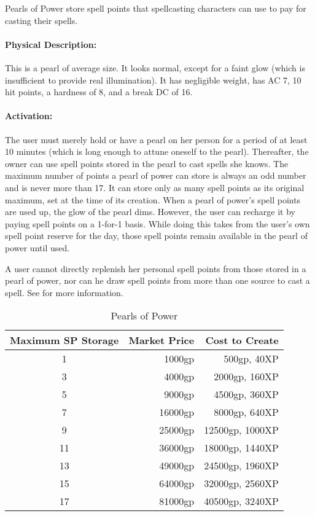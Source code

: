 Pearls of Power store spell points that spellcasting characters can use to pay
for casting their spells.

\paragraph{Physical Description:} This is a pearl of average size.
It looks normal, except for a faint glow (which is insufficient to provide real
illumination). It has negligible weight, has AC 7, 10 hit points, a hardness of
8, and a break DC of 16.

\paragraph{Activation:} The user must merely hold or have a pearl on her person for a
period of at least 10 minutes (which is long enough to attune oneself to the
pearl). Thereafter, the owner can use spell points stored in the pearl to
cast spells she knows.
The maximum number of points a pearl of power can store is always an odd
number and is never more than 17. It can store only as many spell points as its
original maximum, set at the time of its creation. When a pearl of power's
spell points are used up, the glow of the pearl dims. 
However, the user can
recharge it by paying spell points on a 1-for-1 basis. While doing this takes
from the user's own spell point reserve for the day, those spell points remain
available in the pearl of power until used.

A user cannot directly replenish her personal spell points from those stored in
a pearl of power, nor can he draw spell points from more than one source to
cast a spell. See  for more information.

\begin{table*}
\caption{Pearls of Power}
\label{tab:PearlsOfPower}
\centering
\begin{tabular}{|c|r|r|}
\hline
\textbf{Maximum SP Storage}&\textbf{Market Price}&\textbf{Cost to Create}\\
\hline
1&	1000gp	&500gp, 40XP\\
3&	4000gp	&2000gp, 160XP\\
5&	9000gp	&4500gp, 360XP\\
7&	16000gp	&8000gp, 640XP\\
9&	25000gp	&12500gp, 1000XP\\
11&	36000gp	&18000gp, 1440XP\\
13&	49000gp	&24500gp, 1960XP\\
15&	64000gp	&32000gp, 2560XP\\
17&	81000gp	&40500gp, 3240XP\\
\hline
\end{tabular}
\end{table*}

